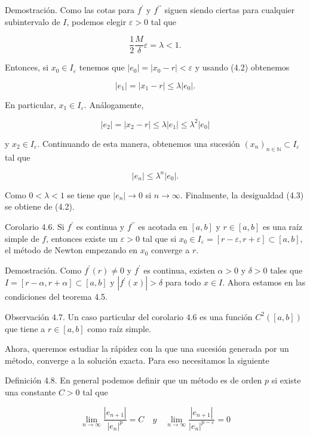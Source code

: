 \documentclass[10pt]{book}
\begin{document}
Demostración. Como las cotas para $f^{\prime}$ y $f^{\prime \prime}$ siguen siendo ciertas para cualquier subintervalo de $I$, podemos elegir $\varepsilon>0$ tal que

$$
\frac{1}{2} \frac{M}{\delta} \varepsilon=\lambda<1 .
$$

Entonces, si $x_{0} \in I_{\varepsilon}$ tenemos que $\left|e_{0}\right|=\left|x_{0}-r\right|<\varepsilon$ y usando (4.2) obtenemos

$$
\left|e_{1}\right|=\left|x_{1}-r\right| \leq \lambda\left|e_{0}\right| .
$$

En particular, $x_{1} \in I_{\varepsilon}$. Análogamente,

$$
\left|e_{2}\right|=\left|x_{2}-r\right| \leq \lambda\left|e_{1}\right| \leq \lambda^{2}\left|e_{0}\right|
$$

y $x_{2} \in I_{\varepsilon}$. Continuando de esta manera, obtenemos una sucesión $\left(x_{n}\right)_{n \in \mathbb{N}} \subset I_{\varepsilon}$ tal que

$$
\left|e_{n}\right| \leq \lambda^{n}\left|e_{0}\right| .
$$

Como $0<\lambda<1$ se tiene que $\left|e_{n}\right| \rightarrow 0$ si $n \rightarrow \infty$. Finalmente, la desigualdad (4.3) se obtiene de (4.2).

Corolario 4.6. Si $f^{\prime}$ es continua y $f^{\prime \prime}$ es acotada en $[a, b]$ y $r \in[a, b]$ es una raíz simple de $f$, entonces existe un $\varepsilon>0$ tal que si $x_{0} \in I_{\varepsilon}=[r-\varepsilon, r+\varepsilon] \subset[a, b]$, el método de Newton empezando en $x_{0}$ converge a $r$.

Demostración. Como $f^{\prime}(r) \neq 0$ y $f^{\prime}$ es continua, existen $\alpha>0$ y $\delta>0$ tales que $I=[r-\alpha, r+\alpha] \subset [a, b]$ y $\left|f^{\prime}(x)\right|>\delta$ para todo $x \in I$. Ahora estamos en las condiciones del teorema 4.5.

Observación 4.7. Un caso particular del corolario 4.6 es una función $C^{2}([a, b])$ que tiene a $r \in[a, b]$ como raíz simple.

Ahora, queremos estudiar la rápidez con la que una sucesión generada por un método, converge a la solución exacta. Para eso necesitamos la siguiente

Definición 4.8. En general podemos definir que un método es de orden $p$ si existe una constante $C>0$ tal que

$$
\lim _{n \rightarrow \infty} \frac{\left|e_{n+1}\right|}{\left|e_{n}\right|^{p}}=C \quad y \quad \lim _{n \rightarrow \infty} \frac{\left|e_{n+1}\right|}{\left|e_{n}\right|^{p-\varepsilon}}=0
$$
\end{document}
